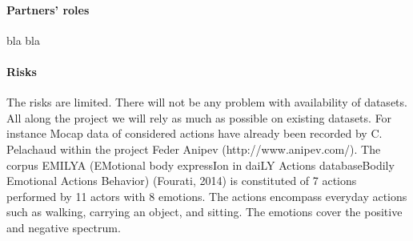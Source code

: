 \paragraph{Partners' roles}

bla bla

\paragraph{Risks}

The risks are limited. There will not be any problem with availability of datasets. All along the project we will rely as much as possible on existing datasets. For instance Mocap data of considered actions have already been recorded by C. Pelachaud within the project Feder Anipev (http://www.anipev.com/). 
The corpus EMILYA (EMotional body expressIon in daiLY Actions databaseBodily Emotional Actions Behavior) (Fourati, 2014) is constituted of 7 actions performed by 11 actors with 8 emotions. The actions encompass everyday actions such as walking, carrying an object, and sitting. 
The emotions cover the positive and negative spectrum.



\endinput